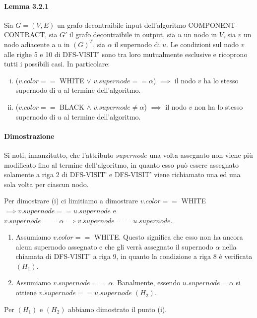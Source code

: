    \paragraph{Lemma 3.2.1}
    Sia $G=(V,E)$ un grafo decontraibile input dell'algoritmo COMPONENT-CONTRACT, sia $G\mathcal{'}$ il grafo decontraibile
    in output, sia $u$ un nodo in $V$, sia $v$ un nodo adiacente a $u$ in $(G)^T$, sia $\alpha$ il supernodo di $u$.
    Le condizioni sul nodo $v$ alle righe 5 e 10 di DFS-VISIT' sono tra loro mutualmente esclusive e ricoprono tutti i
    possibili casi.
    In particolare:
    \begin{enumerate}[(i)]
        \item ($v.color ==$ WHITE $\vee$ $v.supernode == \alpha$) $\implies$ il nodo $v$ ha lo stesso supernodo di $u$ al
        termine dell'algoritmo.
        \item ($v.color ==$ BLACK $\wedge$ $v.supernode \ne \alpha$) $\implies$ il nodo $v$ non ha lo stesso supernodo di
        $u$ al termine dell'algoritmo.
    \end{enumerate}

    \paragraph{Dimostrazione}
    Si noti, innanzitutto, che l'attributo $supernode$ una volta assegnato non viene pi\`u modificato fino al termine
    dell'algoritmo, in quanto esso pu\`o essere assegnato solamente a riga 2 di DFS-VISIT' e DFS-VISIT' viene richiamato
    una ed una sola volta per ciascun nodo. \newline

    Per dimostrare (i) ci limitiamo a dimostrare $v.color ==$ WHITE $ \implies v.supernode == u.supernode$ e
    $v.supernode == \alpha \implies v.supernode == u.supernode$.
    \begin{enumerate}
        \item Assumiamo $v.color ==$ WHITE. Questo significa che esso non ha ancora alcun supernodo assegnato e che gli 
		verr\`a assegnato il supernodo $\alpha$ nella chiamata di DFS-VISIT' a riga 9, in quanto la condizione a riga 8
        \`e verificata $(H_1)$.
        \item Assumiamo $v.supernode == \alpha$.
        Banalmente, essendo $u.supernode = \alpha$ si ottiene $v.supernode == u.supernode$ $(H_2)$.
    \end{enumerate}
    Per $(H_1)$ e $(H_2)$ abbiamo dimostrato il punto (i).


